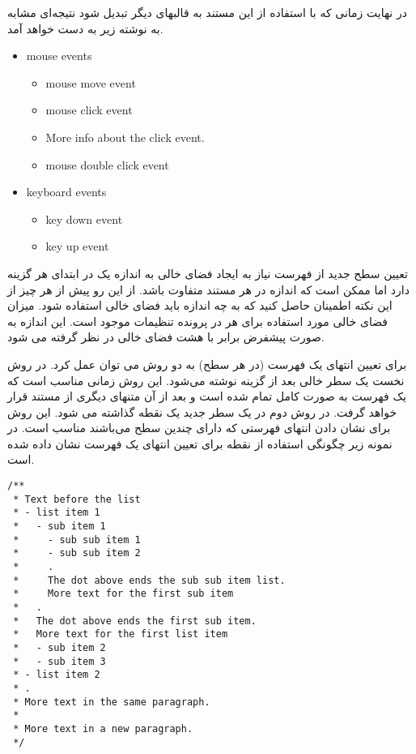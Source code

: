در نهایت زمانی که با استفاده از  این مستند به قالبهای دیگر تبدیل شود
نتیجه‌ای مشابه به نوشته زیر به دست خواهد آمد.

 \begin{latin}
    \begin{itemize}
	\item mouse events
		\begin{itemize}
			\item  mouse move event
			\item  mouse click event
			\item   More info about the click event.
			\item   mouse double click event
		\end{itemize}
	\item keyboard events
		\begin{itemize}
			\item  key down event
			\item  key up event
		\end{itemize}
  \end{itemize}
\end{latin}

\begin{note}
 تعیین  سطح جدید از فهرست نیاز به ایجاد فضای خالی به اندازه یک  در
 ابتدای هر گزینه دارد اما ممکن است که اندازه  در هر مستند متفاوت باشد.
 از این رو پیش از هر چیز از این نکته اطمینان حاصل کنید که به چه اندازه باید فضای
 خالی استفاده شود. میزان فضای خالی مورد استفاده برای هر  در پرونده
 تنظیمات موجود است. این اندازه به صورت پیشفرض برابر با هشت فضای خالی در نظر
 گرفته می شود.
\end{note}

برای تعیین انتهای یک فهرست (در هر سطح) به دو روش می توان عمل کرد. در روش نخست یک
سطر خالی بعد از گزینه نوشته می‌شود. این روش زمانی مناسب است که یک فهرست به صورت
کامل تمام شده است و بعد از آن متنهای دیگری از مستند قرار خواهد گرفت. در روش دوم
در یک سطر جدید یک نقطه گذاشته می شود.
این روش برای نشان دادن انتهای فهرستی که دارای چندین سطح می‌باشند مناسب است. در
نمونه زیر  چگونگی استفاده از نقطه برای تعیین انتهای یک فهرست نشان داده شده است.

\begin{latin}
\lstset{language=C++}  
\begin{lstlisting}[frame=single] 
/**
 * Text before the list
 * - list item 1
 *   - sub item 1
 *     - sub sub item 1
 *     - sub sub item 2
 *     . 
 *     The dot above ends the sub sub item list.
 *     More text for the first sub item
 *   .
 *   The dot above ends the first sub item.
 *   More text for the first list item
 *   - sub item 2
 *   - sub item 3
 * - list item 2
 * .
 * More text in the same paragraph.
 *
 * More text in a new paragraph.
 */
\end{lstlisting}
\end{latin}

